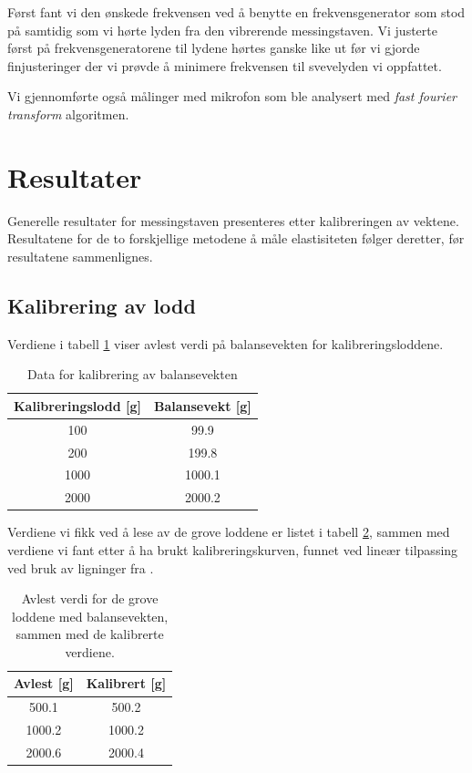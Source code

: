 \documentclass[a4paper,11pt, twocolumn]{article}
\begin{document}
Først fant vi den ønskede frekvensen ved å benytte en frekvensgenerator som stod på samtidig som vi hørte lyden fra den vibrerende messingstaven. Vi justerte først på frekvensgeneratorene til lydene hørtes ganske like ut før vi gjorde finjusteringer der vi prøvde å minimere frekvensen til svevelyden vi oppfattet.

Vi gjennomførte også målinger med mikrofon som ble analysert med \textit{fast fourier transform} algoritmen.

\section{Resultater}
Generelle resultater for messingstaven presenteres etter kalibreringen av vektene. Resultatene for de to forskjellige metodene å måle elastisiteten følger deretter, før resultatene sammenlignes.

\subsection{Kalibrering av lodd}

Verdiene i tabell \ref{tab:kalibrering} viser avlest verdi på balansevekten for kalibreringsloddene.

\begin{table}[!ht]
\centering
\caption{Data for kalibrering av balansevekten}
\label{tab:kalibrering}
\begin{tabular}{cc}
	\toprule
	\toprule
	Kalibreringslodd [g] & Balansevekt [g]\\
	\hline
	100 & 99.9\\
	200 & 199.8\\
	1000 & 1000.1\\
	2000 & 2000.2\\
	\toprule
\end{tabular}
\end{table}

Verdiene vi fikk ved å lese av de grove loddene er listet i tabell \ref{tab:kalibrert}, sammen med verdiene vi fant etter å ha brukt kalibreringskurven, funnet ved lineær tilpassing ved bruk av ligninger fra \cite[s. 39]{squires}.

\begin{table}[!ht]
\centering
\caption{Avlest verdi for de grove loddene med balansevekten, sammen med de kalibrerte verdiene.}
\label{tab:kalibrert}
\begin{tabular}{cc}
	\toprule
	\toprule
	Avlest [g] & Kalibrert [g]\\
	\hline
	500.1 & 500.2\\
	1000.2 & 1000.2\\
	2000.6 & 2000.4\\
	\toprule
\end{tabular}
\end{table}
\end{document}
